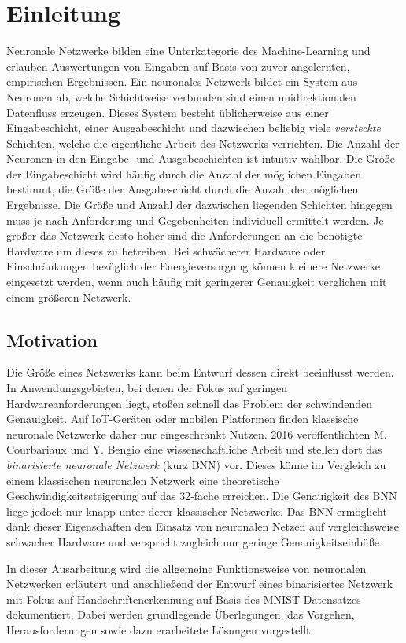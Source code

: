 \chapter{Einleitung}

Neuronale Netzwerke bilden eine Unterkategorie des Machine-Learning und erlauben
Auswertungen von Eingaben auf Basis von zuvor angelernten, empirischen
Ergebnissen.
Ein neuronales Netzwerk bildet ein System aus Neuronen ab, welche Schichtweise
verbunden sind einen unidirektionalen Datenfluss erzeugen.
Dieses System besteht üblicherweise aus einer Eingabeschicht, einer
Ausgabeschicht und dazwischen beliebig viele \emph{versteckte} Schichten,
welche die eigentliche Arbeit des Netzwerks verrichten.
Die Anzahl der Neuronen in den Eingabe- und Ausgabeschichten ist intuitiv
wählbar. Die Größe der Eingabeschicht wird häufig durch die Anzahl der
möglichen Eingaben bestimmt, die Größe der Ausgabeschicht durch die Anzahl
der möglichen Ergebnisse.
Die Größe und Anzahl der dazwischen liegenden Schichten hingegen muss je
nach Anforderung und Gegebenheiten individuell ermittelt werden.
Je größer das Netzwerk desto höher sind die Anforderungen an die benötigte
Hardware um dieses zu betreiben. Bei schwächerer Hardware oder
Einschränkungen bezüglich der Energieversorgung können kleinere Netzwerke
eingesetzt werden, wenn auch häufig mit geringerer Genauigkeit verglichen
mit einem größeren Netzwerk.


\section{Motivation}

Die Größe eines Netzwerks kann beim Entwurf dessen direkt beeinflusst werden.
In Anwendungsgebieten, bei denen der Fokus auf geringen Hardwareanforderungen
liegt, stoßen schnell das Problem der schwindenden Genauigkeit.
Auf IoT-Geräten oder mobilen Platformen finden klassische neuronale Netzwerke
daher nur eingeschränkt Nutzen.
2016 veröffentlichten M. Courbariaux und Y. Bengio \cite{Courbariaux} eine 
wissenschaftliche Arbeit und stellen dort das
\emph{binarisierte neuronale Netzwerk} (kurz BNN) vor.
Dieses könne im Vergleich zu einem klassischen neuronalen Netzwerk eine
theoretische Geschwindigkeitssteigerung auf das 32-fache erreichen.
Die Genauigkeit des BNN liege jedoch nur knapp unter derer klassischer Netzwerke.
Das BNN ermöglicht dank dieser Eigenschaften den Einsatz von neuronalen Netzen
auf vergleichsweise schwacher Hardware und verspricht zugleich
nur geringe Genauigkeitseinbüße.

In dieser Ausarbeitung wird die allgemeine Funktionsweise von neuronalen
Netzwerken erläutert und anschließend der Entwurf eines binarisiertes
Netzwerk mit Fokus auf Handschriftenerkennung auf Basis des MNIST Datensatzes
dokumentiert.
Dabei werden grundlegende Überlegungen, das Vorgehen, Herausforderungen
sowie dazu erarbeitete Lösungen vorgestellt.